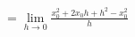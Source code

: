 \documentclass[preview]{standalone}
\begin{document}
\begin{align*}
= \lim_{h\to 0} \frac{x_0^2 + 2x_0 h + h^2 - x_0^2}{h}
\end{align*}
\end{document}

